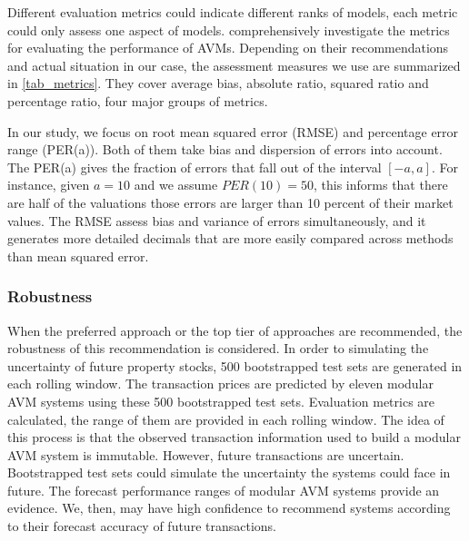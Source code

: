 Different evaluation metrics could indicate different ranks of models, each metric could only assess one aspect of models. \citet{steuerer_etal21} comprehensively investigate the metrics for evaluating the performance of AVMs. Depending on their recommendations and actual situation in our case, the assessment measures we use are summarized in \autoref{tab_metrics}. They cover average bias, absolute ratio, squared ratio and percentage ratio, four major groups of metrics.

%
\begin{quote}
\end{quote}
%

\noindent In our study, we focus on root mean squared error (RMSE) and percentage error range (PER(a)). Both of them take bias and dispersion of errors into account. The PER(a) gives the fraction of errors that fall out of the interval $[-a, a]$. For instance, given $a = 10$ and we assume $PER(10) = 50$, this informs that there are half of the valuations those errors are larger than 10 percent of their market values. The RMSE assess bias and variance of errors simultaneously, and it generates more detailed decimals that are more easily compared across methods than mean squared error.

\subsubsection{Robustness}

When the preferred approach or the top tier of approaches are recommended, the robustness of this recommendation is considered. In order to simulating the uncertainty of future property stocks, 500 bootstrapped test sets are generated in each rolling window. The transaction prices are predicted by eleven modular AVM systems using these 500 bootstrapped test sets. Evaluation metrics are calculated, the range of them are provided in each rolling window. The idea of this process is that the observed transaction information used to build a modular AVM system is immutable. However, future transactions are uncertain. Bootstrapped test sets could simulate the uncertainty the systems could face in future. The forecast performance ranges of modular AVM systems provide an evidence. We, then, may have high confidence to recommend systems according to their forecast accuracy of future transactions.